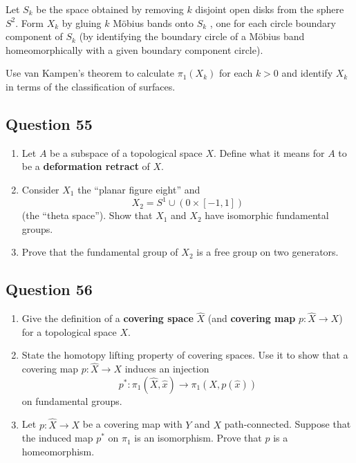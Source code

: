 \documentclass[12pt]{article}
\begin{document}
Let \(S_k\) be the space obtained by removing \(k\) disjoint open disks
from the sphere \(S^2\). Form \(X_k\) by gluing \(k\) Möbius bands onto
\(S_k\) , one for each circle boundary component of \(S_k\) (by
identifying the boundary circle of a Möbius band homeomorphically with a
given boundary component circle).

Use van Kampen's theorem to calculate \(\pi_1 (X_k)\) for each \(k > 0\)
and identify \(X_k\) in terms of the classification of surfaces.

\hypertarget{question-55-3}{%
\subsection{Question 55}\label{question-55-3}}

\begin{enumerate}
\def\labelenumi{\roman{enumi}.}
\item
  Let \(A\) be a subspace of a topological space \(X\). Define what it
  means for \(A\) to be a \textbf{deformation retract} of \(X\).
\item
  Consider \(X_1\) the ``planar figure eight'' and
  \[X_2 = S^1 \cup ({0} \times [-1, 1])\] (the ``theta space''). Show
  that \(X_1\) and \(X_2\) have isomorphic fundamental groups.
\item
  Prove that the fundamental group of \(X_2\) is a free group on two
  generators.
\end{enumerate}

\hypertarget{question-56-3}{%
\subsection{Question 56}\label{question-56-3}}

\begin{enumerate}
\def\labelenumi{\alph{enumi}.}
\item
  Give the definition of a \textbf{covering space} \(\hat{X}\) (and
  \textbf{covering map} \(p : \hat{X} \to X\)) for a topological space
  \(X\).
\item
  State the homotopy lifting property of covering spaces. Use it to show
  that a covering map \(p : \hat{X} \to X\) induces an injection \[
  p^\ast : \pi_1 (\hat{X}, \hat{x}) \to \pi_1 (X, p(\hat{x}))
  \] on fundamental groups.
\item
  Let \(p : \hat{X} \to X\) be a covering map with \(Y\) and \(X\)
  path-connected. Suppose that the induced map \(p^\ast\) on \(\pi_1\)
  is an isomorphism. Prove that \(p\) is a homeomorphism.
\end{enumerate}
\end{document}
